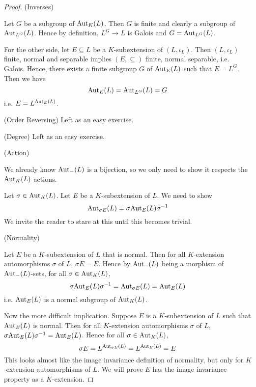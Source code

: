 \documentclass[../book.tex]{subfiles}
\begin{document}
\begin{proof}
    (Inverses)
        
        Let $G$ be a subgroup of $\text{Aut}_{K}(L)$. 
        Then $G$ is finite and clearly a subgroup of $\text{Aut}_{L^G}(L)$. 
        Hence by definition, $L^G \to L$ is Galois 
        and $G = \text{Aut}_{L^G}(L)$. 
        
        For the other side, let $E \subseteq L$ be a $K$-subextension of $(L,\iota_L)$.
        Then $(L,\iota_L)$ finite, normal and separable implies
        $(E,\subseteq)$ finite, normal separable, i.e. Galois.
        Hence, there exists a finite subgroup $G$ of $\text{Aut}_{E}(L)$ such that $E = L^G$.
        Then we have \[
            \text{Aut}_{E}(L) = \text{Aut}_{L^G}(L) = G
        \]
        i.e. $E = L^{\text{Aut}_{E}(L)}$. 
        
    (Order Reversing) Left as an easy exercise. 
        
    (Degree) Left as an easy exercise.
    
    (Action) 
        
        We already know $\text{Aut}_{-}(L)$ is a bijection,
        so we only need to show it respects the $\text{Aut}_{K}(L)$-actions.
        
        Let $\sigma \in \text{Aut}_{K}(L)$. Let $E$ be a $K$-subextension of $L$. 
        We need to show \[
            \text{Aut}_{\sigma E}(L) = \sigma \text{Aut}_{E}(L) \sigma^{-1}
        \]
        We invite the reader to stare at this
        until this becomes trivial. 
    
    (Normality)
        
        Let $E$ be a $K$-subextension of $L$ that is normal. 
        Then for all $K$-extension automorphisms $\sigma$ of $L$, $\sigma E = E$. 
        Hence by $\text{Aut}_{-}(L)$ being a morphism of $\text{Aut}_{-}(L)$-sets,
        for all $\sigma \in \text{Aut}_{K}(L)$, \[
            \sigma \text{Aut}_{E}(L) \sigma^{-1} = \text{Aut}_{\sigma E}(L) = \text{Aut}_{E}(L)
        \]
        i.e. $\text{Aut}_{E}(L)$ is a normal subgroup of $\text{Aut}_{K}(L)$.
        
        Now the more difficult implication. 
        Suppose $E$ is a $K$-subextension of $L$ such that
        $\text{Aut}_{E}(L)$ is normal. 
        Then for all $K$-extension automorphisms $\sigma$ of $L$, 
        $\sigma \text{Aut}_{E}(L) \sigma^{-1} = \text{Aut}_{E}(L)$.
        Hence for all $\sigma \in \text{Aut}_{K}(L)$, \[
            \sigma E = L^{\text{Aut}_{\sigma E}(L)} = L^{\text{Aut}_{E}(L)} = E
        \]
        This looks almost like the image invariance definition of normality,
        but only for $K$-extension automorphisms of $L$. 
        We will prove $E$ has the image invariance property as a $K$-extension. 
        

\end{proof}
\end{document}
